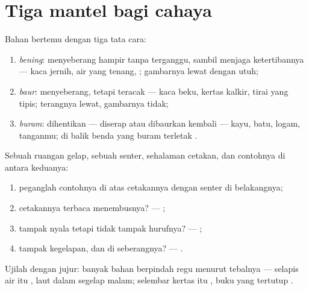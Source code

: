 \section{Tiga mantel bagi cahaya}

\begin{definition}\label{def:g7:light-sources-propagation:coats}
Bahan bertemu  dengan tiga tata cara:
\begin{enumerate}
  \item \emph{bening}:  menyeberang hampir tanpa
        terganggu, sambil menjaga ketertibannya --- kaca jernih, air
        yang tenang, ; gambarnya lewat dengan utuh;
  \item \emph{baur}:  menyeberang, tetapi teracak
        --- kaca beku, kertas kalkir, tirai yang tipis; terangnya
        lewat, gambarnya tidak;
  \item \emph{buram}:  dihentikan --- diserap atau
        dibaurkan kembali --- kayu, batu, logam, tanganmu; di balik
        benda yang buram terletak .
\end{enumerate}
\end{definition}

\begin{method}\label{met:g7:light-sources-propagation:sort}
Sebuah ruangan gelap, sebuah senter, sehalaman cetakan, dan
contohnya di antara keduanya:
\begin{enumerate}
  \item peganglah contohnya di atas cetakannya dengan senter di
        belakangnya;
  \item cetakannya terbaca menembusnya? --- ;
  \item tampak nyala tetapi tidak tampak hurufnya? --- ;
  \item tampak kegelapan, dan  di seberangnya? --- .
\end{enumerate}
Ujilah dengan jujur: banyak bahan berpindah regu menurut tebalnya ---
selapis air itu , laut dalam segelap malam; selembar kertas itu
, buku yang tertutup .
\end{method}


